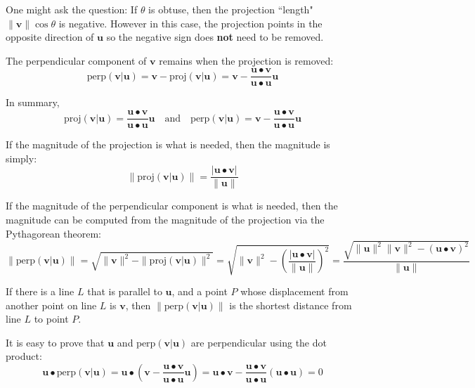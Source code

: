 \documentclass{article}
\begin{document}
One might ask the question: If \(\theta\) is obtuse, then the projection ``length" \(\|\mathbf{v}\|\cos\theta\) is negative. However in this case, the projection points in the opposite direction of \(\mathbf{u}\) so the negative sign does {\bf not} need to be removed.

The perpendicular component of \(\mathbf{v}\) remains when the projection is removed:
\[\text{perp}(\mathbf{v}|\mathbf{u}) = \mathbf{v} - \text{proj}(\mathbf{v}|\mathbf{u}) = \mathbf{v} - \frac{\mathbf{u} \bullet \mathbf{v}}{\mathbf{u} \bullet \mathbf{u}}\mathbf{u}\]

In summary, 
\[\text{proj}(\mathbf{v}|\mathbf{u}) = \frac{\mathbf{u} \bullet \mathbf{v}}{\mathbf{u} \bullet \mathbf{u}}\mathbf{u} \quad\text{and}\quad \text{perp}(\mathbf{v}|\mathbf{u}) = \mathbf{v} - \frac{\mathbf{u} \bullet \mathbf{v}}{\mathbf{u} \bullet \mathbf{u}}\mathbf{u}\]

If the magnitude of the projection is what is needed, then the magnitude is simply:
\[\|\text{proj}(\mathbf{v}|\mathbf{u})\| = \frac{|\mathbf{u} \bullet \mathbf{v}|}{\|\mathbf{u}\|}\]

If the magnitude of the perpendicular component is what is needed, then the magnitude can be computed from the magnitude of the projection via the Pythagorean theorem:
\[\|\text{perp}(\mathbf{v}|\mathbf{u})\| 
= \sqrt{\|\mathbf{v}\|^2 - \|\text{proj}(\mathbf{v}|\mathbf{u})\|^2} 
= \sqrt{\|\mathbf{v}\|^2 - \left(\frac{|\mathbf{u} \bullet \mathbf{v}|}{\|\mathbf{u}\|}\right)^2}
= \frac{\sqrt{\|\mathbf{u}\|^2\|\mathbf{v}\|^2 - (\mathbf{u} \bullet \mathbf{v})^2}}{\|\mathbf{u}\|}\]

\vspace{5mm}

If there is a line \(L\) that is parallel to \(\mathbf{u}\), and a point \(P\) whose displacement from another point on line \(L\) is \(\mathbf{v}\), then \(\|\text{perp}(\mathbf{v}|\mathbf{u})\|\) is the shortest distance from line \(L\) to point \(P\).

\vspace{5mm}

It is easy to prove that \(\mathbf{u}\) and \(\text{perp}(\mathbf{v}|\mathbf{u})\) are perpendicular using the dot product: 
\[\mathbf{u} \bullet \text{perp}(\mathbf{v}|\mathbf{u}) = 
\mathbf{u} \bullet \left(\mathbf{v} - \frac{\mathbf{u} \bullet \mathbf{v}}{\mathbf{u} \bullet \mathbf{u}}\mathbf{u}\right) = 
\mathbf{u} \bullet \mathbf{v} - \frac{\mathbf{u} \bullet \mathbf{v}}{\mathbf{u} \bullet \mathbf{u}}(\mathbf{u} \bullet \mathbf{u}) = 
0\]
\end{document}
